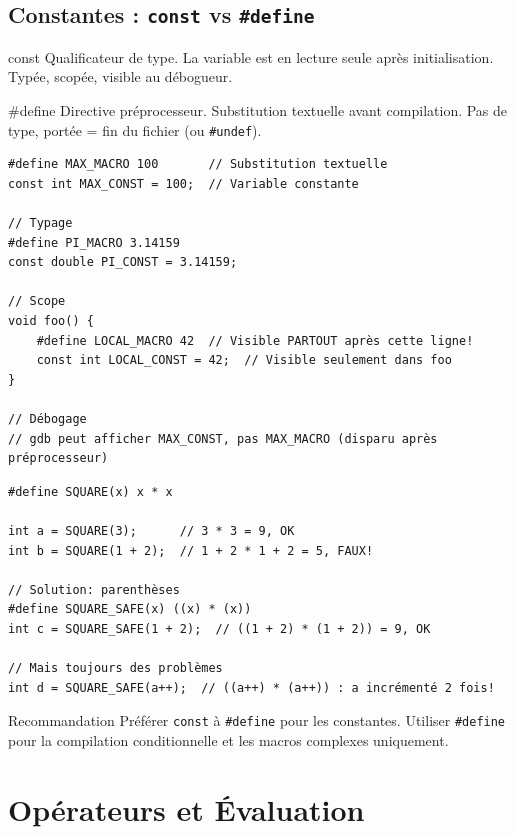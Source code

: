 \documentclass[10pt,a4paper]{article}
\begin{document}
\subsection{Constantes : \texttt{const} vs \texttt{\#define}}

\begin{techbox}{const}
Qualificateur de type. La variable est en lecture seule après initialisation. Typée, scopée, visible au débogueur.
\end{techbox}

\begin{techbox}{\#define}
Directive préprocesseur. Substitution textuelle avant compilation. Pas de type, portée = fin du fichier (ou \texttt{\#undef}).
\end{techbox}

\begin{lstlisting}[caption={const vs \#define}]
#define MAX_MACRO 100       // Substitution textuelle
const int MAX_CONST = 100;  // Variable constante

// Typage
#define PI_MACRO 3.14159
const double PI_CONST = 3.14159;

// Scope
void foo() {
    #define LOCAL_MACRO 42  // Visible PARTOUT après cette ligne!
    const int LOCAL_CONST = 42;  // Visible seulement dans foo
}

// Débogage
// gdb peut afficher MAX_CONST, pas MAX_MACRO (disparu après préprocesseur)
\end{lstlisting}

\begin{lstlisting}[caption={Pièges du \#define}]
#define SQUARE(x) x * x

int a = SQUARE(3);      // 3 * 3 = 9, OK
int b = SQUARE(1 + 2);  // 1 + 2 * 1 + 2 = 5, FAUX!

// Solution: parenthèses
#define SQUARE_SAFE(x) ((x) * (x))
int c = SQUARE_SAFE(1 + 2);  // ((1 + 2) * (1 + 2)) = 9, OK

// Mais toujours des problèmes
int d = SQUARE_SAFE(a++);  // ((a++) * (a++)) : a incrémenté 2 fois!
\end{lstlisting}

\begin{warningbox}{Recommandation}
Préférer \texttt{const} à \texttt{\#define} pour les constantes. Utiliser \texttt{\#define} pour la compilation conditionnelle et les macros complexes uniquement.
\end{warningbox}

\section{Opérateurs et Évaluation}
\end{document}
